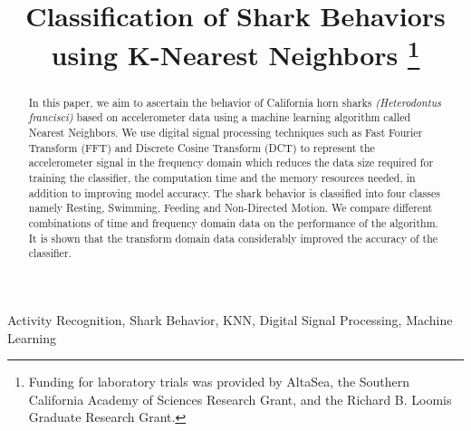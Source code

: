 \documentclass[conference]{IEEEtran}
\begin{document}
\title{Classification of Shark Behaviors using K-Nearest Neighbors \thanks{Funding for laboratory trials was provided by AltaSea, the Southern California Academy of Sciences Research Grant, and the Richard B. Loomis Graduate Research Grant.}
}

\author{
}

\maketitle


\begin{abstract}
In this paper, we aim to ascertain the behavior of California horn sharks \textit{(Heterodontus francisci)} based on accelerometer data using a machine learning algorithm called Nearest Neighbors. We use digital signal processing techniques such as Fast Fourier Transform (FFT) and Discrete Cosine Transform (DCT) to represent the accelerometer signal in the frequency domain which reduces the data size required for training the classifier, the computation time and the memory resources needed, in addition to improving model accuracy. The shark behavior is classified into four classes namely Resting, Swimming, Feeding and Non-Directed Motion. We compare different combinations of time and frequency domain data on the performance of the algorithm. It is shown that the transform domain data considerably improved the accuracy of the classifier.
\end{abstract}

\begin{IEEEkeywords}
Activity Recognition, Shark Behavior, KNN, Digital Signal Processing, Machine Learning
\end{IEEEkeywords}
\end{document}
